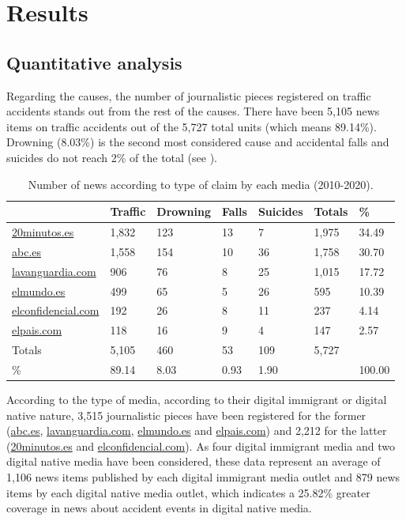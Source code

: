 \section{Results}\label{sec-results}

\subsection{Quantitative analysis}\label{sub-sec-quantitativeanalysis}

Regarding the causes, the number of journalistic pieces registered on
traffic accidents stands out from the rest of the causes. There have
been 5,105 news items on traffic accidents out of the 5,727 total units
(which means 89.14\%). Drowning (8.03\%) is the second most considered
cause and accidental falls and suicides do not reach 2\% of the total
(see ).

\begin{table}[!htpb]
\centering
\begin{threeparttable}
\caption{Number of news according to type of claim by each media (2010-2020).}
\label{tab-01}
\begin{tabular}{*{7}{l}}
\toprule
& Traffic & Drowning & Falls & Suicides & Totals & \% \\
\midrule
\url{20minutos.es} & 1,832 & 123 & 13 & 7 & 1,975 & 34.49 \\
\url{abc.es} & 1,558 & 154 & 10 & 36 & 1,758 & 30.70 \\
\url{lavanguardia.com} & 906 & 76 & 8 & 25 & 1,015 & 17.72 \\
\url{elmundo.es} & 499 & 65 & 5 & 26 & 595 & 10.39 \\
\url{elconfidencial.com} & 192 & 26 & 8 & 11 & 237 & 4.14 \\
\url{elpais.com} & 118 & 16 & 9 & 4 & 147 & 2.57 \\
Totals & 5,105 & 460 & 53 & 109 & 5,727 & \\
\% & 89.14 & 8.03 & 0.93 & 1.90 & & 100.00 \\
\bottomrule
\end{tabular}
\end{threeparttable}
\end{table}

According to the type of media, according to their digital immigrant or
digital native nature, 3,515 journalistic pieces have been registered
for the former (\url{abc.es}, \url{lavanguardia.com}, \url{elmundo.es} and
\url{elpais.com}) and 2,212 for the latter (\url{20minutos.es} and
\url{elconfidencial.com}). As four digital immigrant media and two
digital native media have been considered, these data represent an
average of 1,106 news items published by each digital immigrant media
outlet and 879 news items by each digital native media outlet, which
indicates a 25.82\% greater coverage in news about accident events in
digital native media.

